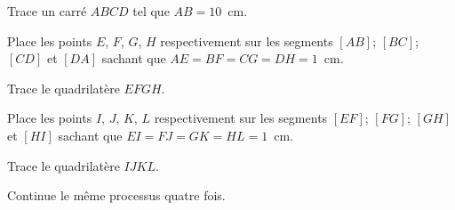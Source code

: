 \begin{myenumerate}
\item Trace un carré $ABCD$ tel que $AB=10$~cm.
\item Place les points $E$, $F$, $G$, $H$ respectivement sur les
segments $[AB]$; $[BC]$; $[CD]$ et $[DA]$ sachant que
$AE=BF=CG=DH=1$~cm.
\par Trace le quadrilatère $EFGH$.
\item Place les points $I$, $J$, $K$, $L$ respectivement sur les
segments $[EF]$; $[FG]$; $[GH]$ et $[HI]$ sachant que
$EI=FJ=GK=HL=1$~cm.
\par Trace le quadrilatère $IJKL$.
\item Continue le même processus quatre fois.
\end{myenumerate}